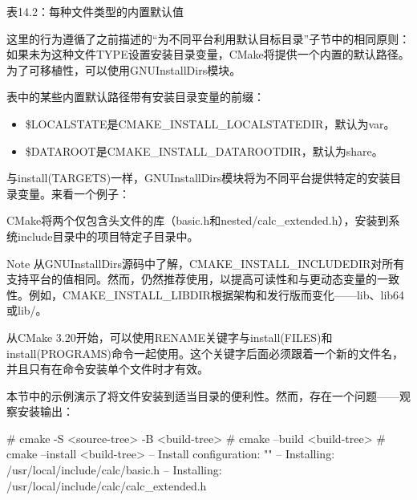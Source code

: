 \begin{center}
表14.2：每种文件类型的内置默认值
\end{center}

这里的行为遵循了之前描述的“为不同平台利用默认目标目录”子节中的相同原则：如果未为这种文件TYPE设置安装目录变量，CMake将提供一个内置的默认路径。为了可移植性，可以使用GNUInstallDirs模块。

表中的某些内置默认路径带有安装目录变量的前缀：

\begin{itemize}
\item
\$LOCALSTATE是CMAKE\_INSTALL\_LOCALSTATEDIR，默认为var。

\item
\$DATAROOT是CMAKE\_INSTALL\_DATAROOTDIR，默认为share。
\end{itemize}

与install(TARGETS)一样，GNUInstallDirs模块将为不同平台提供特定的安装目录变量。来看一个例子：



CMake将两个仅包含头文件的库（basic.h和nested/calc\_extended.h），安装到系统include目录中的项目特定子目录中。

\begin{myNotic}{Note}
从GNUInstallDirs源码中了解，CMAKE\_INSTALL\_INCLUDEDIR对所有支持平台的值相同。然而，仍然推荐使用，以提高可读性和与更动态变量的一致性。例如，CMAKE\_INSTALL\_LIBDIR根据架构和发行版而变化——lib、lib64或lib/。
\end{myNotic}

从CMake 3.20开始，可以使用RENAME关键字与install(FILES)和install(PROGRAMS)命令一起使用。这个关键字后面必须跟着一个新的文件名，并且只有在命令安装单个文件时才有效。

本节中的示例演示了将文件安装到适当目录的便利性。然而，存在一个问题——观察安装输出：

\begin{shell}
# cmake -S <source-tree> -B <build-tree>
# cmake --build <build-tree>
# cmake --install <build-tree>
-- Install configuration: ""
-- Installing: /usr/local/include/calc/basic.h
-- Installing: /usr/local/include/calc/calc_extended.h
\end{shell}

